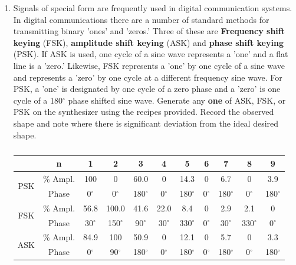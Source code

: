 \begin{enumerate}
\begin{marginfigure}[+0in]
\caption*{Amplitude Shift Keying}
\label{fig:fs13}
\end{marginfigure}




\item Signals of special form are frequently used in digital communication systems. In digital communications there are a number of standard methods for transmitting binary 'ones' and 'zeros.'  Three of these are {\bf Frequency shift keying} (FSK), {\bf amplitude shift keying} (ASK) and {\bf phase shift keying} (PSK). If ASK is used, one cycle of a sine wave represents a 'one' and a flat line is a 'zero.'  Likewise, FSK represents a 'one' by one cycle of a sine wave and represents a 'zero' by one cycle at a different frequency sine wave. For PSK, a 'one' is designated by one cycle of a zero phase and a 'zero' is one cycle of a 180$^{\circ}$ phase shifted sine wave. Generate any {\bf one} of ASK, FSK, or PSK on the synthesizer using the recipes provided. Record the observed shape and note where there is significant deviation from the ideal desired shape.

\begin{table}
\footnotesize
\begin{tabular}{c|c|c|c|c|c|c|c|c|c|c|}
\cline{2-11}
&n&1&2&3&4&5&6&7&8&9\\ \hline
\multicolumn{1}{|c|}{\multirow{2}{*}{PSK}}&\% Ampl.&100&0&60.0&0&14.3&0&6.7&0&3.9\\
\multicolumn{1}{|c|}{}&Phase&0$^{\circ}$&0$^{\circ}$&180$^{\circ}$&0$^{\circ}$&180$^{\circ}$&0$^{\circ}$&180$^{\circ}$&0$^{\circ}$&180$^{\circ}$\\ \hline
\multicolumn{1}{|c|}{\multirow{2}{*}{FSK}}&\% Ampl.&56.8&100.0&41.6&22.0&8.4&0&2.9&2.1&0\\
\multicolumn{1}{|c|}{}&Phase&30$^{\circ}$&150$^{\circ}$&90$^{\circ}$&30$^{\circ}$&330$^{\circ}$&0$^{\circ}$&30$^{\circ}$&330$^{\circ}$&0$^{\circ}$\\ \hline
\multicolumn{1}{|c|}{\multirow{2}{*}{ASK}}&\% Ampl.&84.9&100&50.9&0&12.1&0&5.7&0&3.3\\
\multicolumn{1}{|c|}{}&Phase&0$^{\circ}$&90$^{\circ}$&180$^{\circ}$&0$^{\circ}$&180$^{\circ}$&0$^{\circ}$&180$^{\circ}$&0$^{\circ}$&180$^{\circ}$\\ \hline
\end{tabular}
\normalsize
\caption{ }
\label{tab:fs4}
\end{table}


\end{enumerate}
